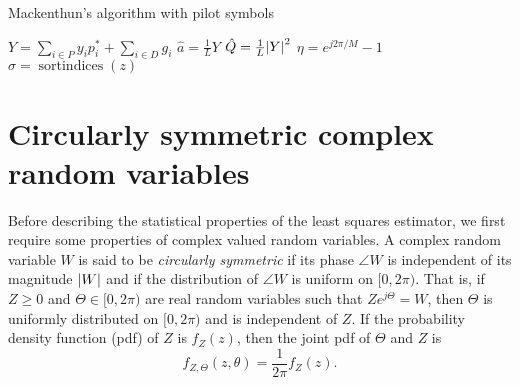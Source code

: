 \documentclass[draftcls, onecolumn, 11pt]{IEEEtran}
\begin{document}
\begin{algorithm}[t] \label{alg:loglinear}
\SetAlCapFnt{\small}
\SetAlTitleFnt{}
\caption{Mackenthun's algorithm with pilot symbols}
\DontPrintSemicolon
{}
$Y = \sum_{i \in P} y_i p_i^* + \sum_{i \in D} g_i $ \;
$\hat{a} = \frac{1}{L} Y$  \;
$\hat{Q} = \frac{1}{L}{\left\vert Y \right\vert}^2$  \;
$\eta = e^{j2\pi/M} - 1$ \;
$\sigma = \operatorname{sortindices}(z)$  \;
\end{algorithm}


\section{Circularly symmetric complex random variables}\label{sec:circ-symm-compl}

Before describing the statistical properties of the least squares estimator, we first require some properties of complex valued random variables.  A complex random variable $W$ is said to be \emph{circularly symmetric} if its phase $\angle{W}$ is independent of its magnitude ${\left\vert W \right\vert}$ and if the distribution of $\angle{W}$ is uniform on $[0,2\pi)$.  That is, if $Z \geq 0$ and $\Theta \in [0,2\pi)$ are real random variables such that $Ze^{j\Theta} = W$, then $\Theta$ is uniformly distributed on $[0,2\pi)$ and is independent of $Z$.  If the probability density function (pdf) of $Z$ is $f_Z(z)$, then the joint pdf of $\Theta$ and $Z$ is 
\[
f_{Z,\Theta}(z,\theta) = \frac{1}{2\pi}f_Z(z).
\]
\end{document}
